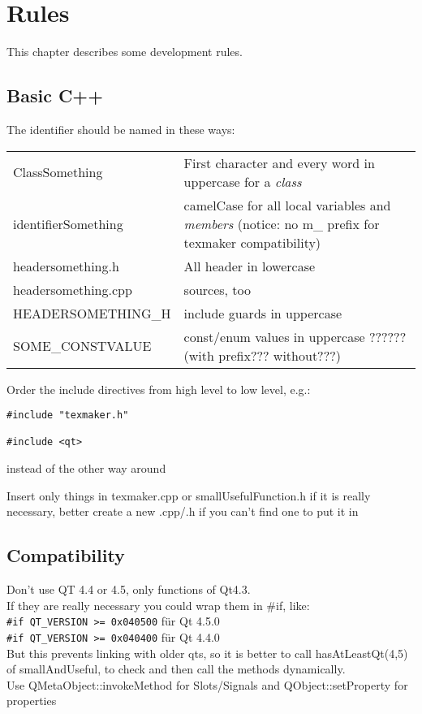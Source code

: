 \documentclass[10pt,a4paper,landscape]{report}
\begin{document}
\chapter{Rules}
This chapter describes some development rules.

\section{Basic C++}
The identifier should be named in these ways:\\
\begin{tabular}{ll}
ClassSomething & First character and every word in uppercase for a \emph{class}\\
identifierSomething & camelCase for all local variables and \emph{members} (notice: no m\_ prefix for texmaker compatibility)\\
headersomething.h & All header in lowercase \\
headersomething.cpp & sources, too \\
HEADERSOMETHING\_H & include guards in uppercase \\
SOME\_CONSTVALUE & const/enum values in uppercase ?????? (with prefix??? without???)
\end{tabular}

Order the include directives from high level to low level, e.g.:\\
\begin{verbatim}
#include "texmaker.h"

#include <qt>
\end{verbatim}
instead of the other way around

Insert only things in texmaker.cpp or smallUsefulFunction.h if it is really necessary,
better create a new .cpp/.h if you can't find one to put it in

\section {Compatibility}
Don't use QT 4.4 or 4.5, only functions of Qt4.3.\\
If they are really necessary you could wrap them in \#if, like: \\
\verb+#if QT_VERSION >= 0x040500+ für Qt 4.5.0\\
\verb+#if QT_VERSION >= 0x040400+ für Qt 4.4.0\\

But this prevents linking with older qts, so it is better  to call hasAtLeastQt(4,5) of smallAndUseful, to check and then call the methods dynamically.\\
Use QMetaObject::invokeMethod for Slots/Signals and QObject::setProperty for properties
\end{document}
